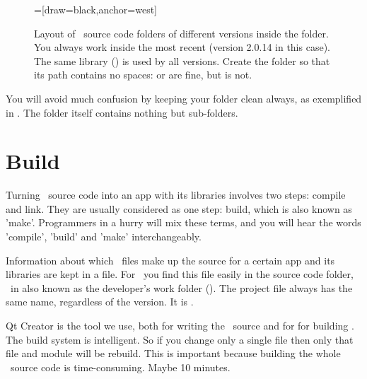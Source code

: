 \begin {figure} [ht]
\centering
{}=[draw=black,anchor=west]
\caption{Layout of \US\ source code folders of different versions inside the  folder. You always work inside the most recent (version 2.0.14 in this case). The same  library () is used by all versions. Create the  folder so that its path contains no spaces:  or  are fine, but  is not.}
\label{fig:unisim-versions}
\end{figure}

You will avoid much confusion by keeping your  folder clean always, as exemplified in . The  folder itself contains nothing but sub-folders.

\section{Build \protect\US}
Turning \CPP\ source code into an app with its libraries involves two steps: compile and link. They are usually considered as one step: build, which is also known as 'make'. Programmers in a hurry will mix these terms, and you will hear the words 'compile', 'build' and 'make' interchangeably.

Information about which \CPP\ files make up the source for a certain app and its libraries are kept in a  file. For \US\ you find this file easily in the source code folder, \eg\ in  also known as the developer's work folder (\devhomefolderexplained). The project file always has the same name, regardless of the version. It is .

Qt Creator is the tool we use, both for writing the \CPP\ source and for for building \US. The build system is intelligent. So if you change only a single file then only that file and module will be rebuild. This is important because building the whole \US\ source code is time-consuming. Maybe 10 minutes.

